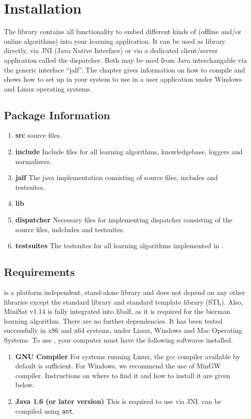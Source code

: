 \chapter{Installation}
The \libalf library contains all functionality to embed different kinds of (offline and/or online algorithms) into your learning application. It can be used as \cpp library directly, via JNI (Java Native Interface) or via a dedicated client/server application called the dispatcher. Both may be used from Java interchangable via the generic interface ``jalf''.
The chapter gives information on how to compile \libalf and shows how to set up \libalf in your system to use in a user application under Windows and Linux operating systems.

\section{Package Information}
\begin{enumerate}
 \item \textbf{src}
	\libalf source files. 
 \item \textbf{include}
	Include files for all learning algorithms, knowledgebase, loggers and normalizers.
 \item \textbf{jalf}
	The java implementation consisting of source files, includes and testsuites. 
 \item \textbf{lib}
 	
 \item \textbf{dispatcher}
 	Necessary files for implementing dispatcher consisting of the source files, indcludes and testsuites.
 \item \textbf{testsuites}
        The testsuites for all learning algorithms implemented in \libalf.
\end{enumerate}

\section{Requirements}
\libalf is a platform independent, stand-alone \cpp library and does not depend on any other libraries except the \cpp standard library and standard template library (STL). Also, MiniSat v1.14 is fully integrated into libalf, as it is required for the bierman learning algorithm. There are no further dependencies. It has been tested successfully in x86 and x64 systems, under Linux, Windows and Mac Operating Systems. To use \libalf, your computer must have the following softwares installed.
\begin{enumerate}
 \item \textbf{GNU Compiler} \vskip 1pt
	For systems running Linux, the gcc compiler available by default is sufficient. \vskip 1pt
	For Windows, we recommend the use of MinGW compiler. Instructions on where to find it and how to install it are given below.
 \item \textbf{Java 1.6 (or later version)} \vskip 1pt
	This is required to use \libalf via JNI. \jalf can be compiled using \texttt{ant}.
\end{enumerate}
